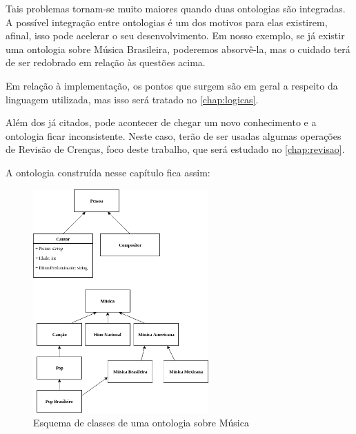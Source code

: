 Tais problemas tornam-se muito maiores quando duas ontologias são integradas. A possível integração entre ontologias é um dos motivos para elas existirem, afinal, isso pode acelerar o seu desenvolvimento. Em nosso exemplo, se já existir uma ontologia sobre Música Brasileira, poderemos absorvê-la, mas o cuidado terá de ser redobrado em relação às questões acima. 

Em relação à implementação, os pontos que surgem são em geral a respeito da linguagem utilizada, mas isso será tratado no \autoref{chap:logicas}.

Além dos já citados, pode acontecer de chegar um novo conhecimento e a ontologia ficar inconsistente. Neste caso, terão de ser usadas algumas operações de Revisão de Crenças, foco deste trabalho, que será estudado no \autoref{chap:revisao}.

A ontologia construída nesse capítulo fica assim: 

\begin{figure}[H]
	\centering
	\includegraphics[width=0.6\textwidth]{Capitulos/Ontologias/OntologiaMusica}
	\caption{Esquema de classes de uma ontologia sobre Música}
\end{figure}